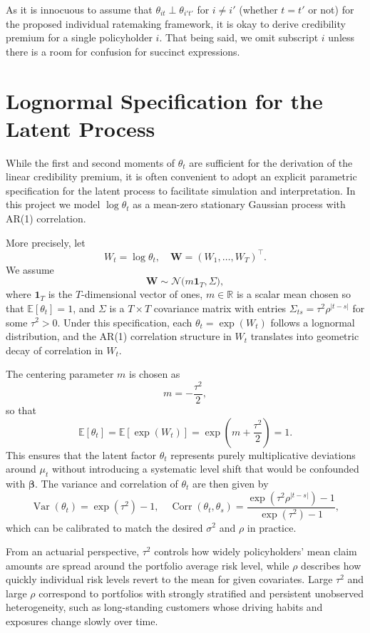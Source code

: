 \documentclass{sfuthesis}
\numberwithin{equation}{chapter}
\begin{document}
As it is innocuous to assume that $\theta_{it} \perp \theta_{i't'}$ for $i \ne i'$ (whether $t=t'$ or not) for the proposed individual ratemaking framework, it is okay to derive credibility premium for a single policyholder $i$. That being said, we omit subscript $i$ unless there is a room for confusion for succinct expressions.

\section{Lognormal Specification for the Latent Process}
\label{subsec:lognormal}

While the first and second moments of \(\theta_t\) are sufficient for the
derivation of the linear credibility premium, it is often convenient to adopt
an explicit parametric specification for the latent process to facilitate
simulation and interpretation. In this project we model \(\log \theta_t\) as
a mean-zero stationary Gaussian process with AR(1) correlation.

More precisely, let
\[
W_t = \log \theta_t,
\quad
\mathbf{W} = (W_1, \ldots, W_T)^\top.
\]
We assume
\[
\mathbf{W} \sim \mathcal{N}\big( m \mathbf{1}_T, \Sigma \big),
\]
where \(\mathbf{1}_T\) is the \(T\)-dimensional vector of ones,
\(m \in \mathbb{R}\) is a scalar mean chosen so that \(\mathbb{E}[\theta_t] = 1\),
and \(\Sigma\) is a \(T \times T\) covariance matrix with entries
\(\Sigma_{ts} = \tau^2 \rho^{|t-s|}\) for some \(\tau^2 > 0\).
Under this specification, each \(\theta_t = \exp(W_t)\) follows a lognormal
distribution, and the AR(1) correlation structure in \(W_t\) translates into
geometric decay of correlation in \(W_t\). 

The centering parameter \(m\) is chosen as
\[
m = -\frac{\tau^2}{2},
\]
so that
\[
\mathbb{E}[\theta_t]
= \mathbb{E}[\exp(W_t)]
= \exp\!\left( m + \frac{\tau^2}{2} \right)
= 1.
\]
This ensures that the latent factor \(\theta_t\) represents purely multiplicative
deviations around \(\mu_t\) without introducing a systematic
level shift that would be confounded with \(\boldsymbol{\beta}\). The variance
and correlation of \(\theta_t\) are then given by
\[
\operatorname{Var}(\theta_t)
= \exp(\tau^2) - 1,
\quad
\operatorname{Corr}(\theta_t, \theta_s)
= \frac{\exp(\tau^2 \rho^{|t-s|}) - 1}{\exp(\tau^2) - 1},
\]
which can be calibrated to match the desired \(\sigma^2\) and \(\rho\) in
practice. 

From an actuarial perspective, \(\tau^2\) controls how widely policyholders' mean claim amounts are spread around the portfolio average risk level, while \(\rho\) describes
how quickly individual risk levels revert to the mean for given covariates. Large \(\tau^2\) and
large \(\rho\) correspond to portfolios with strongly stratified and persistent
unobserved heterogeneity, such as long-standing customers whose driving habits
and exposures change slowly over time.
\end{document}
